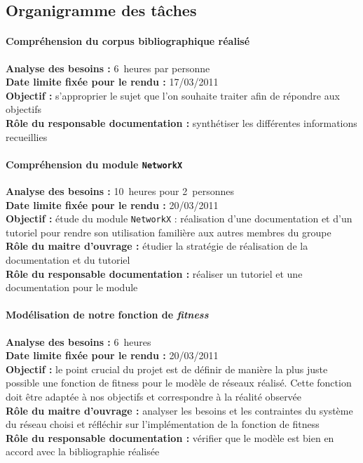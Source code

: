 \subsection{Organigramme des tâches}
\paragraph*{Compréhension du corpus bibliographique réalisé\\}
\textbf{Analyse des besoins :} 6~heures par personne\\
\textbf{Date limite fixée pour le rendu :} 17/03/2011\\
\textbf{Objectif : }s'approprier le sujet que l'on souhaite traiter afin de répondre aux objectifs\\
\textbf{Rôle du responsable documentation :} synthétiser les différentes informations recueillies

\paragraph*{Compréhension du module \verb?NetworkX?\\}
\textbf{Analyse des besoins :} 10~heures pour 2~personnes\\
\textbf{Date limite fixée pour le rendu :} 20/03/2011\\
\textbf{Objectif :} étude du module \verb?NetworkX? : réalisation d'une documentation et d'un tutoriel pour rendre son utilisation familière aux autres membres du groupe\\
\textbf{Rôle du maitre d'ouvrage : }étudier la stratégie de réalisation de la documentation et du tutoriel\\
\textbf{Rôle du responsable documentation : }réaliser un tutoriel et une documentation pour le module

\paragraph*{Modélisation de notre fonction de \textit{fitness}\\}
\textbf{Analyse des besoins : }6~heures\\
\textbf{Date limite fixée pour le rendu :} 20/03/2011\\
\textbf{Objectif : }le point crucial du projet est de définir de manière la plus juste possible une fonction de fitness pour le modèle de réseaux réalisé. Cette fonction doit être adaptée à nos objectifs et correspondre à la réalité observée\\
\textbf{Rôle du maitre d'ouvrage : }analyser les besoins et les contraintes du système du réseau choisi et réfléchir sur l'implémentation de la fonction de fitness\\
\textbf{Rôle du responsable documentation : }vérifier que le modèle est bien en accord avec la bibliographie réalisée

